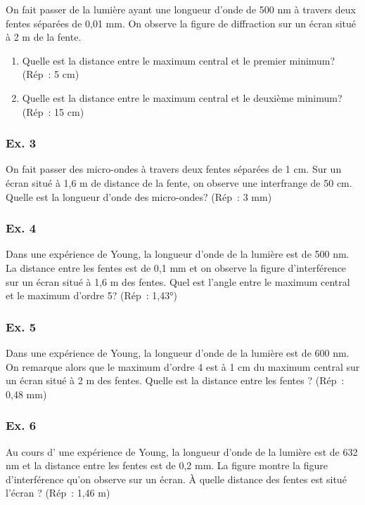 On fait passer de la lumière ayant une longueur d'onde de 500 nm à
travers deux fentes séparées de 0,01 mm. On observe la figure de
diffraction sur un écran situé à 2 m de la fente.

\begin{enumerate}
  \item Quelle est la distance entre le maximum central et le premier
minimum? (Rép~: 5 cm)
 \item Quelle est la distance entre le maximum central et le deuxième
minimum? (Rép~: 15 cm)
\end{enumerate}

\subsubsection{Ex. 3}

On fait passer des micro-ondes à travers deux fentes séparées de 1 cm.
Sur un écran situé à 1,6 m de distance de la fente, on observe une
interfrange de 50 cm. Quelle est la longueur d'onde des micro-ondes?
(Rép~: 3 mm)

\subsubsection{Ex. 4}

Dans une expérience de Young, la longueur d'onde de la lumière est de
500 nm. La distance entre les fentes est de 0,1 mm et on observe la
figure d'interférence sur un écran situé à 1,6 m des fentes. Quel est
l'angle entre le maximum central et le maximum d'ordre 5? (Rép~: 1,43°)

\subsubsection{Ex. 5}

Dans une expérience de Young, la longueur d'onde de la lumière est de
600 nm. On remarque alors que le maximum d'ordre 4 est à 1 cm du maximum central
sur un écran situé à 2 m des fentes. Quelle est la distance entre les
fentes\textbf{ }? (Rép~: 0,48 mm)

\subsubsection{Ex. 6}

Au cours d' une expérience de Young, la longueur d'onde de la lumière
est de 632 nm et la distance entre les fentes est de 0,2 mm. La figure montre la figure
d'interférence qu'on observe sur un écran. À quelle distance des fentes est situé
l'écran ? (Rép~: 1,46 m)

